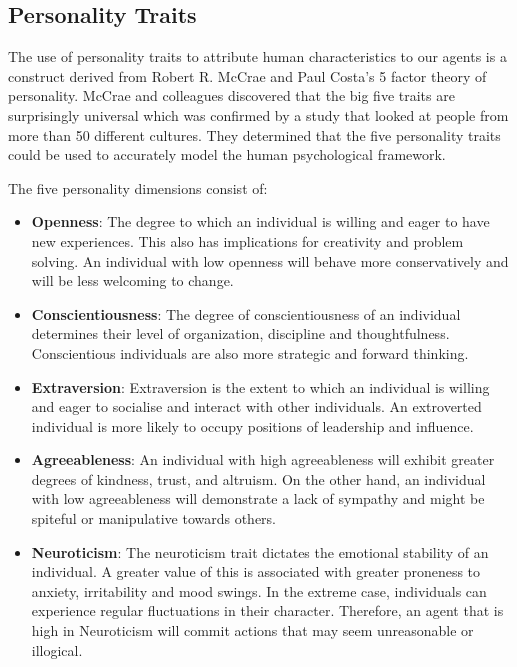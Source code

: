 \subsection{Personality Traits}
\label{subsec: Agent Design}
The use of personality traits to attribute human characteristics to our agents is a construct derived from Robert R. McCrae and Paul Costa's 5 factor theory of personality. McCrae and colleagues discovered that the big five traits are surprisingly universal which was confirmed by a study that looked at people from more than 50 different cultures. They determined that the five personality traits could be used to accurately model the human psychological framework.

The five personality dimensions consist of: 
\begin{itemize}
    \item  \textbf{Openness}: The degree to which an individual is willing and eager to have new experiences. This also has implications for creativity and problem solving. An individual with low openness will behave more conservatively and will be less welcoming to change. 
    
    \item  \textbf{Conscientiousness}: The degree of conscientiousness of an individual determines their level of organization, discipline and thoughtfulness. Conscientious individuals are also more strategic and forward thinking. 
    
    \item  \textbf{Extraversion}: Extraversion is the extent to which an individual is willing and eager to socialise and interact with other individuals. An extroverted individual is more likely to occupy positions of leadership and influence. 
    
    \item  \textbf{Agreeableness}: An individual with high agreeableness will exhibit greater degrees of kindness, trust, and altruism. On the other hand, an individual with low agreeableness will demonstrate a lack of sympathy and might be spiteful or manipulative towards others. 
    
    \item  \textbf{Neuroticism}: The neuroticism trait dictates the emotional stability of an individual. A greater value of this is associated with greater proneness to anxiety, irritability and mood swings. In the extreme case, individuals can experience regular fluctuations in their character. Therefore, an agent that is high in Neuroticism will commit actions that may seem unreasonable or illogical. 
\end{itemize}

